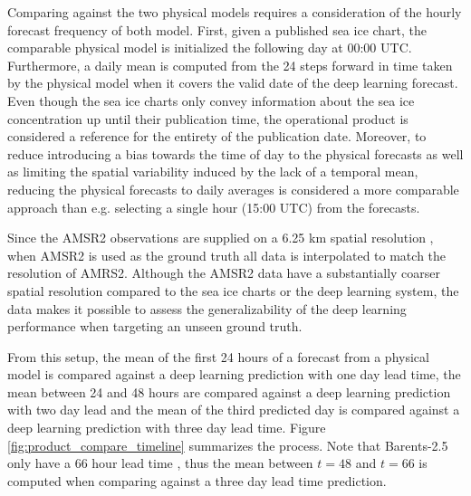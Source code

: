 \documentclass[../main/thesis.tex]{subfiles}
\begin{document}
Comparing against the two physical models requires a consideration of the hourly forecast frequency \citep{Williams2021, Roehrs2022} of both model. First, given a published sea ice chart, the comparable physical model is initialized the following day at 00:00 UTC. Furthermore, a daily mean is computed from the 24 steps forward in time taken by the physical model when it covers the valid date of the deep learning forecast. Even though the sea ice charts only convey information about the sea ice concentration up until their publication time, the operational product is considered a reference for the entirety of the publication date. Moreover, to reduce introducing a bias towards the time of day to the physical forecasts as well as limiting the spatial variability induced by the lack of a temporal mean, reducing the physical forecasts to daily averages is considered a more comparable approach than e.g. selecting a single hour (15:00 UTC) from the forecasts.

Since the AMSR2 observations are supplied on a 6.25 km spatial resolution \citep{Spreen2008}, when AMSR2 is used as the ground truth all data is interpolated to match the resolution of AMRS2. Although the AMSR2 data have a substantially coarser spatial resolution compared to the sea ice charts or the deep learning system, the data makes it possible to assess the generalizability of the deep learning performance when targeting an unseen ground truth.

From this setup, the mean of the first 24 hours of a forecast from a physical model is compared against a deep learning prediction with one day lead time, the mean between 24 and 48 hours are compared against a deep learning prediction with two day lead and the mean of the third predicted day is compared against a deep learning prediction with three day lead time. Figure \ref{fig:product_compare_timeline} summarizes the process. Note that Barents-2.5 only have a 66 hour lead time \citep{Roehrs2022}, thus the mean between $t = 48$ and $t = 66$ is computed when comparing against a three day lead time prediction.
\end{document}
